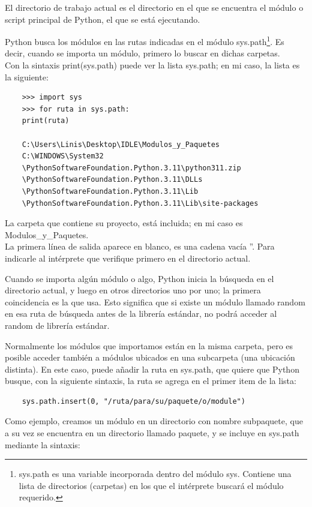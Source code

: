 El directorio de trabajo actual es el directorio en el que se encuentra el módulo o script principal de  Python, el que se está ejecutando.

Python busca los módulos en las rutas indicadas  en el módulo {\ttfamily sys.path}\footnote{{\ttfamily sys.path} es una variable incorporada dentro del módulo {\ttfamily sys}. Contiene una lista de directorios (carpetas) en los que el intérprete buscará el módulo requerido.}. Es decir, cuando se importa un módulo, primero lo buscar en dichas carpetas.\\

Con la sintaxis {\ttfamily print(sys.path)} puede ver la lista {\ttfamily sys.path}; en mi caso, la lista es la siguiente:

\begin{lstlisting}
	>>> import sys
	>>> for ruta in sys.path:
	print(ruta)
	
	C:\Users\Linis\Desktop\IDLE\Modulos_y_Paquetes
	C:\WINDOWS\System32
	\PythonSoftwareFoundation.Python.3.11\python311.zip
	\PythonSoftwareFoundation.Python.3.11\DLLs
	\PythonSoftwareFoundation.Python.3.11\Lib
	\PythonSoftwareFoundation.Python.3.11\Lib\site-packages
\end{lstlisting}
La carpeta que contiene su proyecto, está incluida; en mi caso es Modulos\_y\_Paquetes.\\

La primera línea de salida aparece en blanco, es una cadena vacía  {\ttfamily''}.  Para indicarle al intérprete que verifique primero en el directorio actual.

Cuando se importa algún módulo o algo,  Python inicia la búsqueda en el directorio actual, y luego en otros directorios uno por uno; la primera coincidencia es la que usa. Esto significa que si existe un módulo llamado {\ttfamily random} en  esa ruta de búsqueda antes de la librería estándar, no podrá acceder al {\ttfamily random}  de librería estándar.

Normalmente los módulos que importamos están en la misma carpeta, pero es posible acceder también a módulos ubicados en una subcarpeta (una ubicación distinta). En este caso, puede añadir la ruta en {\ttfamily sys.path},
que quiere que Python busque, con la siguiente sintaxis,  la ruta se agrega en el primer item de la lista:
\begin{lstlisting}
	sys.path.insert(0, "/ruta/para/su/paquete/o/module")
\end{lstlisting}	
Como ejemplo, creamos un módulo en un directorio con nombre {\ttfamily subpaquete}, que a su vez se encuentra en un directorio llamado {\ttfamily paquete}, y se incluye en {\ttfamily sys.path} mediante la sintaxis: 

